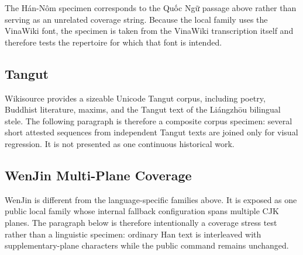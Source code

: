 The Hán-Nôm specimen corresponds to the Quốc Ngữ passage above rather than
serving as an unrelated coverage string. Because the local family uses the
VinaWiki font, the specimen is taken from the VinaWiki transcription itself
and therefore tests the repertoire for which that font is intended.



\subsection{Tangut}

Wikisource provides a sizeable Unicode Tangut corpus, including poetry,
Buddhist literature, maxims, and the Tangut text of the Liángzhōu bilingual
stele. The following paragraph is therefore a composite corpus specimen:
several short attested sequences from independent Tangut texts are joined
only for visual regression. It is not presented as one continuous historical
work.



\subsection{WenJin Multi-Plane Coverage}

WenJin is different from the language-specific families above. It is exposed
as one public local family whose internal fallback configuration spans
multiple CJK planes. The paragraph below is therefore intentionally a
coverage stress test rather than a linguistic specimen: ordinary Han text is
interleaved with supplementary-plane characters while the public command
remains unchanged.


